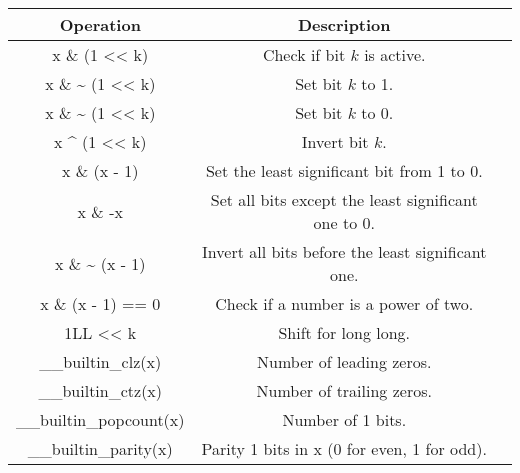 
\begin{center}
    \begin{tabular}{|c|c|c|}
        \hline
        Operation & Description \\ 
        \hline
        x \& (1 << k)            & Check if bit $k$ is active. \\
        x \& \~{}  (1 << k)      & Set bit $k$ to 1. \\
        x \& \~{} (1 << k)       & Set bit $k$ to 0. \\
        x \^{} (1 << k)          & Invert bit $k$. \\
        x \& (x - 1)             & Set the least significant bit from 1 to 0. \\
        x \& -x                  & Set all bits except the least significant one to 0. \\
        x \& \~{}  (x - 1)       & Invert all bits before the least significant one. \\
        x \& (x - 1) == 0        & Check if a number is a power of two. \\
        1LL << k                 & Shift for long long. \\
        \_\_builtin\_clz(x)      & Number of leading zeros. \\
        \_\_builtin\_ctz(x)      & Number of trailing zeros. \\
        \_\_builtin\_popcount(x) & Number of 1 bits. \\
        \_\_builtin\_parity(x)   & Parity 1 bits in x (0 for even, 1 for odd). \\
        \hline
    \end{tabular}
\end{center}